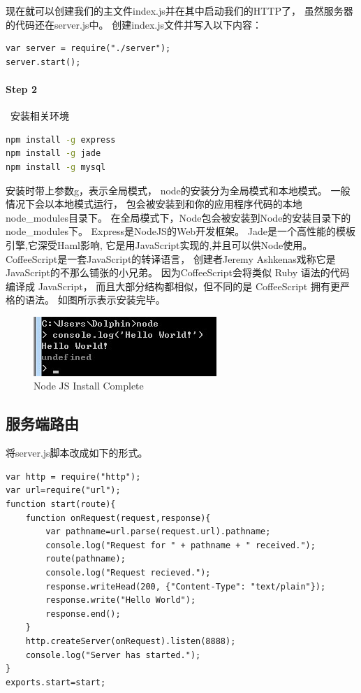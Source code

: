 \documentclass{book}
\begin{document}
现在就可以创建我们的主文件index.js并在其中启动我们的HTTP了，
虽然服务器的代码还在server.js中。
创建index.js文件并写入以下内容：

\begin{lstlisting}[language=VBScript]
var server = require("./server");
server.start();
\end{lstlisting}

\paragraph{Step 2}~安装相关环境

\begin{lstlisting}[language=Bash]
npm install -g express  
npm install -g jade
npm install -g mysql
\end{lstlisting}

安装时带上参数g，表示全局模式，
node的安装分为全局模式和本地模式。
一般情况下会以本地模式运行，
包会被安装到和你的应用程序代码的本地node\_modules目录下。
在全局模式下，Node包会被安装到Node的安装目录下的node\_modules下。
Express是NodeJS的Web开发框架。
Jade是一个高性能的模板引擎,它深受Haml影响,
它是用JavaScript实现的,并且可以供Node使用。
CoffeeScript是一套JavaScript的转译语言，
创建者Jeremy Ashkenas戏称它是JavaScript的不那么铺张的小兄弟。
因为CoffeeScript会将类似 Ruby 语法的代码编译成 JavaScript，
而且大部分结构都相似，但不同的是 CoffeeScript 拥有更严格的语法。
如图所示表示安装完毕。

\begin{figure}[htbp]
	\centering
	\includegraphics[scale=1]{NodeJSInstallCompelete.jpg}
	\caption{Node JS Install Complete}
	\label{fig:NodeJSInstallCompelete}
\end{figure}


\subsection{服务端路由}

将server.js脚本改成如下的形式。

\begin{lstlisting}[language=VBScript]
var http = require("http");
var url=require("url");
function start(route){
	function onRequest(request,response){
		var pathname=url.parse(request.url).pathname;		
		console.log("Request for " + pathname + " received.");		
		route(pathname);		
		console.log("Request recieved.");
		response.writeHead(200, {"Content-Type": "text/plain"});
		response.write("Hello World");
		response.end();
	}	
	http.createServer(onRequest).listen(8888);
	console.log("Server has started.");
}
exports.start=start;
\end{lstlisting}
\end{document}
